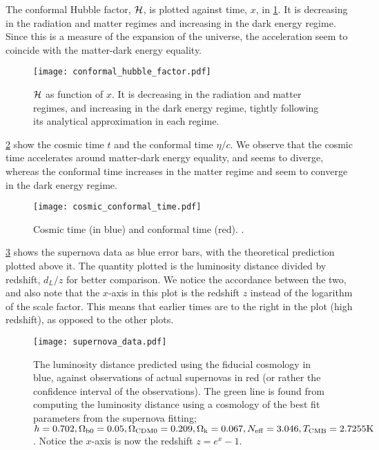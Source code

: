     The conformal Hubble factor, $\mathcal{H}$, is plotted against time, $x$, in \cref{fig:m1:conformal_hubble_factor_Hp}. It is decreasing in the radiation and matter regimes and increasing in the dark energy regime. Since this is a measure of the expansion of the universe, the acceleration seem to coincide with the matter-dark energy equality. 
    \begin{figure}
        \texttt{[image: conformal\_hubble\_factor.pdf]}
        \caption{$\mathcal{H}$ as function of $x$. It is decreasing in the radiation and matter regimes, and increasing in the dark energy regime, tightly following its analytical approximation in each regime.}
        \label{fig:m1:conformal_hubble_factor_Hp}
    \end{figure}

    \cref{fig:m1:cosmic_conformal_time} show the cosmic time $t$ and the conformal time $\eta/c$. We observe that the cosmic time accelerates around matter-dark energy equality, and seems to diverge, whereas the conformal time increases in the matter regime and seem to converge in the dark energy regime.

    \begin{figure}
        \texttt{[image: cosmic\_conformal\_time.pdf]}
        \caption{Cosmic time (in blue) and conformal time (red). .}
        \label{fig:m1:cosmic_conformal_time}
    \end{figure}

    \cref{fig:m1:supernova_data} shows the supernova data as blue error bars, with the theoretical prediction plotted above it. The quantity plotted is the luminosity distance divided by redshift, $d_L/z$ for better comparison. We notice the accordance between the two, and also note that the $x$-axis in this plot is the redshift $z$ instead of the logarithm of the scale factor. This means that earlier times are to the right in the plot (high redshift), as opposed to the other plots. 

    \begin{figure}
        \texttt{[image: supernova\_data.pdf]}
        \caption{The luminosity distance predicted using the fiducial cosmology in blue, against observations of actual supernovas in red (or rather the confidence interval of the observations). The green line is found from computing the luminosity distance using a cosmology of the best fit parameters from the supernova fitting; $h=0.702, \Omega_\mathrm{b0} = 0.05, \Omega_\mathrm{CDM0} = 0.209, \Omega_\mathrm{k}=0.067, N_\mathrm{eff}=3.046, T_\mathrm{CMB}=2.7255 \text{K}$. Notice the $x$-axis is now the redshift $z=e^x-1$.}
        \label{fig:m1:supernova_data}
    \end{figure}


